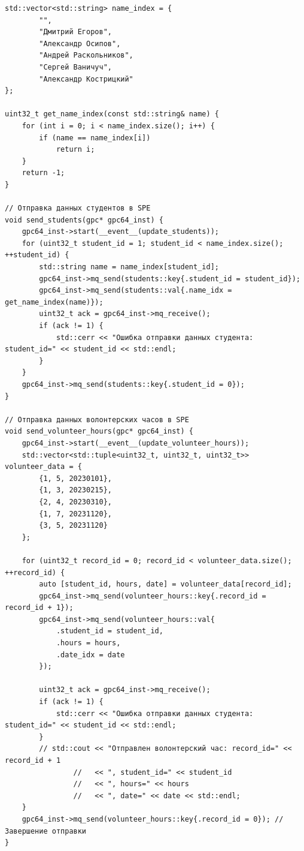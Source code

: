 \documentclass{article}
\begin{document}
\begin{lstlisting}[style=lang, label=host, caption=Описание хост-подсистемы]
std::vector<std::string> name_index = {
        "",
        "Дмитрий Егоров",
        "Александр Осипов",
        "Андрей Раскольников",
        "Сергей Ваничуч",
        "Александр Кострицкий"
};

uint32_t get_name_index(const std::string& name) {
    for (int i = 0; i < name_index.size(); i++) {
        if (name == name_index[i])
            return i;
    }
    return -1;
}

// Отправка данных студентов в SPE
void send_students(gpc* gpc64_inst) {
    gpc64_inst->start(__event__(update_students));
    for (uint32_t student_id = 1; student_id < name_index.size(); ++student_id) {
        std::string name = name_index[student_id];
        gpc64_inst->mq_send(students::key{.student_id = student_id});
        gpc64_inst->mq_send(students::val{.name_idx = get_name_index(name)});
        uint32_t ack = gpc64_inst->mq_receive();
        if (ack != 1) {
            std::cerr << "Ошибка отправки данных студента: student_id=" << student_id << std::endl;
        }
    }
    gpc64_inst->mq_send(students::key{.student_id = 0});
}

// Отправка данных волонтерских часов в SPE
void send_volunteer_hours(gpc* gpc64_inst) {
    gpc64_inst->start(__event__(update_volunteer_hours));
    std::vector<std::tuple<uint32_t, uint32_t, uint32_t>> volunteer_data = {
        {1, 5, 20230101},
        {1, 3, 20230215},
        {2, 4, 20230310},
        {1, 7, 20231120},
        {3, 5, 20231120}
    };

    for (uint32_t record_id = 0; record_id < volunteer_data.size(); ++record_id) {
        auto [student_id, hours, date] = volunteer_data[record_id];
        gpc64_inst->mq_send(volunteer_hours::key{.record_id = record_id + 1});
        gpc64_inst->mq_send(volunteer_hours::val{
            .student_id = student_id,
            .hours = hours,
            .date_idx = date
        });

        uint32_t ack = gpc64_inst->mq_receive();
        if (ack != 1) {
            std::cerr << "Ошибка отправки данных студента: student_id=" << student_id << std::endl;
        }
        // std::cout << "Отправлен волонтерский час: record_id=" << record_id + 1
                //   << ", student_id=" << student_id
                //   << ", hours=" << hours
                //   << ", date=" << date << std::endl;
    }
    gpc64_inst->mq_send(volunteer_hours::key{.record_id = 0}); // Завершение отправки
}


\end{lstlisting}
\end{document}
